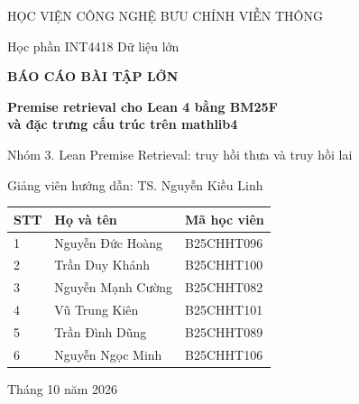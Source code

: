 \documentclass[11pt,a4paper,oneside]{report}
\begin{document}
\begin{titlepage}
\centering
{\large HỌC VIỆN CÔNG NGHỆ BƯU CHÍNH VIỄN THÔNG\par}
\vspace{1.2cm}
{\large Học phần INT4418 \quad Dữ liệu lớn\par}
\vspace{2.2cm}
{\Large\bfseries BÁO CÁO BÀI TẬP LỚN\par}
\vspace{0.8cm}
{\LARGE\bfseries Premise retrieval cho Lean 4 bằng BM25F\\[4pt] và đặc trưng cấu trúc trên mathlib4\par}
\vspace{0.8cm}
{\large Nhóm 3. Lean Premise Retrieval: truy hồi thưa và truy hồi lai\par}
\vspace{2cm}
{\large Giảng viên hướng dẫn: TS. Nguyễn Kiều Linh\par}
\vspace{1.2cm}
\begin{tabular}{lll}
\toprule
\textbf{STT} & \textbf{Họ và tên} & \textbf{Mã học viên} \\
\midrule
1 & Nguyễn Đức Hoàng & B25CHHT096 \\
2 & Trần Duy Khánh & B25CHHT100 \\
3 & Nguyễn Mạnh Cường & B25CHHT082 \\
4 & Vũ Trung Kiên & B25CHHT101 \\
5 & Trần Đình Dũng & B25CHHT089 \\
6 & Nguyễn Ngọc Minh & B25CHHT106 \\
\bottomrule
\end{tabular}
\vfill
{\large Tháng 10 năm 2026\par}
\end{titlepage}

\end{document}
